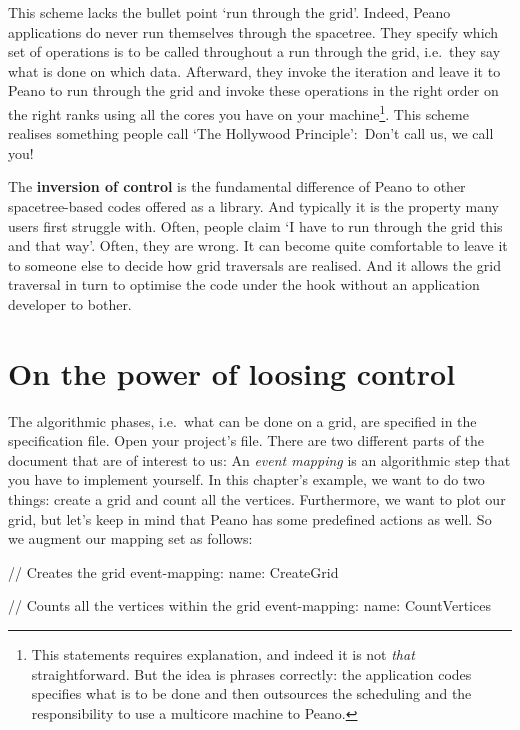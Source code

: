 This scheme lacks the bullet point `run through the grid'. 
Indeed, Peano applications do never run themselves through the spacetree.
They specify which set of operations is to be called throughout a run through
the grid, i.e.~they say what is done on which data.
Afterward, they invoke the iteration and leave it to Peano to run through the
grid and invoke these operations in the right order on the right ranks using all
the cores you have on your machine\footnote{This statements requires
explanation, and indeed it is not {\em that} straightforward. But the idea is
phrases correctly: the application codes specifies what is to be done and then
outsources the scheduling and the responsibility to use a multicore machine to
Peano.}.
This scheme realises something people call `The Hollywood Principle': Don't
call us, we call you!


\begin{remark}
  The {\bf inversion of control} is the fundamental difference of Peano to other
  spacetree-based codes offered as a library. 
  And typically it is the property many users first struggle with.
  Often, people claim `I have to run through the grid this and that way'. 
  Often, they are wrong.
  It can become quite comfortable to leave it to someone else to decide how 
  grid traversals are realised.
  And it allows the grid traversal in turn to optimise the code under the hook
  without an application developer to bother.
\end{remark}


\section{On the power of loosing control}

The algorithmic phases, i.e.~what can be done on a grid, are specified in the
specification file.
Open your project's file. 
There are two different parts of the document that are of interest to us:
An {\em event mapping} is an algorithmic step that you have to implement
yourself.
In this chapter's example, we want to do two things: create a grid and count all
the vertices. 
Furthermore, we want to plot our grid, but let's keep in mind that Peano has
some predefined actions as well.
So we augment our mapping set as follows:

\begin{code}
// Creates the grid
event-mapping:
  name: CreateGrid

// Counts all the vertices within the grid
event-mapping:
  name: CountVertices
\end{code}

